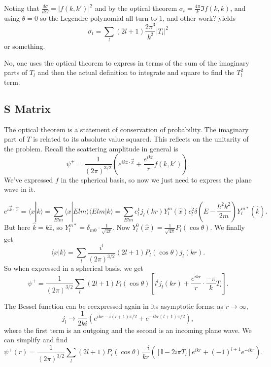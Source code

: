\documentclass[fontsize=12pt]{scrartcl}
\newcommand{\bb}[1]{\mathbb{#1}}
\newcommand{\Id}{\bb{I}}
\newcommand{\la}{\langle}
\newcommand{\ra}{\rangle}
\begin{document}
Noting that $\frac{d\sigma}{d\Omega} = |f(k,k')|^2$ and by the optical theorem $\sigma_t = \frac{4\pi}{k} \Im f(k,k)$, and using $\theta=0$ so the Legendre polynomial all turn to 1, and other work? yields $$\sigma_t = \sum_l (2l+1) \frac{2\pi^3}{k^2}|T_l|^2$$ or something. 

No, one uses the optical theorem to express in terms of the sum of the imaginary parts of $T_l$ and then the actual definition to integrate and square to find the $T_l^2$ term.

\subsection{S Matrix}

The optical theorem is a statement of conservation of probability. The imaginary part of $T$ is related to its absolute value squared. This reflects on the unitarity of the problem. Recall the scattering amplitude in general is $$\psi^+ = \frac{1}{(2\pi)^{3/2}}\left(e^{ik\hat{z}\cdot\vec{x}} + \frac{e^{ikr}}{r}f(k,k')\right).$$ We've expressed $f$ in the spherical basis, so now we just need to express the plane wave in it.

$$e^{i\vec{k}\cdot\vec{x}} = \la x|k\ra = \sum_{Elm}\la x|Elm\ra\la Elm|k\ra = \sum_{Elm} c_l^1 j_l(kr)Y_l^m(\hat{x})c_l^2 \delta\left(E-\frac{\hbar^2k^2}{2m}\right)Y_l^{m*}(\hat{k}).$$ But here $\hat{k}=k\hat{z}$, so $Y_l^{m*}=\delta_{m0}\cdot\frac{1}{\sqrt{4\pi}}.$ Now $Y_l^0(\hat{x}) = \frac{1}{\sqrt{4\pi}}P_l(\cos\theta)$. We finally get $$\la x|k\ra = \sum_l  \frac{i^l}{(2\pi)^{3/2}}(2l+1)P_l(\cos\theta)j_l(kr).$$ So when expressed in a spherical basis, we get $$\psi^+ = \frac{1}{(2\pi)^{3/2}} \sum_l (2l+1)P_l(\cos\theta)\left[i^lj_l(kr) + \frac{e^{ikr}}{r} \cdot\frac{-\pi}{k} T_l\right].$$

The Bessel function can be reexpressed again in its asymptotic forms: as $r\to\infty$, $$j_l \to \frac{1}{2ki}\left(e^{ikr-i(l+1)\pi/2}+e^{-ikr (l+1)\pi/2}\right),$$ where the first term is an outgoing and the second is an incoming plane wave. We can simplify and find $$\psi^+(r)=\frac{1}{(2\pi)^{3/2}}\sum_l(2l+1) P_l(\cos\theta) \frac{-i}{kr}\left(\left[\Id - 2i\pi T_l\right]e^{ikr} + (-1)^{l+1}e^{-ikr}\right).$$
\end{document}
